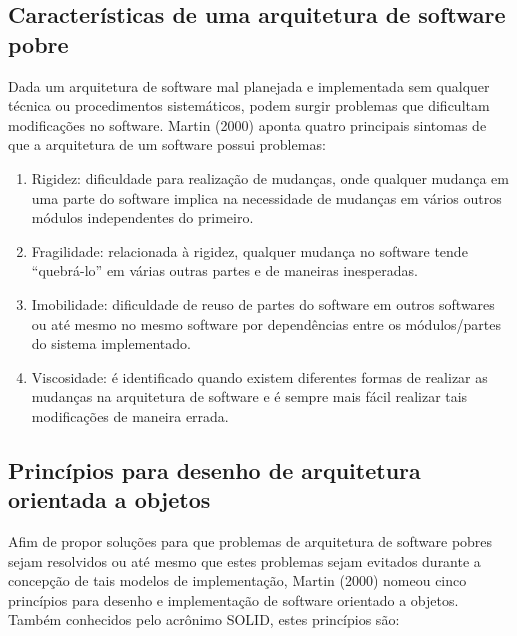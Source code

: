 \subsection{Características de uma arquitetura de software pobre}
Dada um arquitetura de software mal planejada e implementada sem qualquer técnica ou procedimentos sistemáticos, podem surgir problemas que dificultam modificações no software. Martin (2000) aponta quatro principais sintomas de que a arquitetura de um software possui problemas:

\begin{enumerate}
	\item Rigidez: dificuldade para realização de mudanças, onde qualquer mudança em uma parte do software implica na necessidade de mudanças em vários outros módulos independentes do primeiro.
	\item Fragilidade: relacionada à rigidez, qualquer mudança no software tende “quebrá-lo” em várias outras partes e de maneiras inesperadas.
	\item Imobilidade: dificuldade de reuso de partes do software em outros softwares ou até mesmo no mesmo software por dependências entre os módulos/partes do sistema implementado.
	\item Viscosidade: é identificado quando existem diferentes formas de realizar as mudanças na arquitetura de software e é sempre mais fácil realizar tais modificações de maneira errada.
\end{enumerate}

\subsection{Princípios para desenho de arquitetura orientada a objetos}
Afim de propor soluções para que problemas de arquitetura de software pobres sejam resolvidos ou até mesmo que estes problemas sejam evitados durante a concepção de tais modelos de implementação, Martin (2000) nomeou cinco princípios para desenho e implementação de software orientado a objetos. Também conhecidos pelo acrônimo SOLID, estes princípios são:

